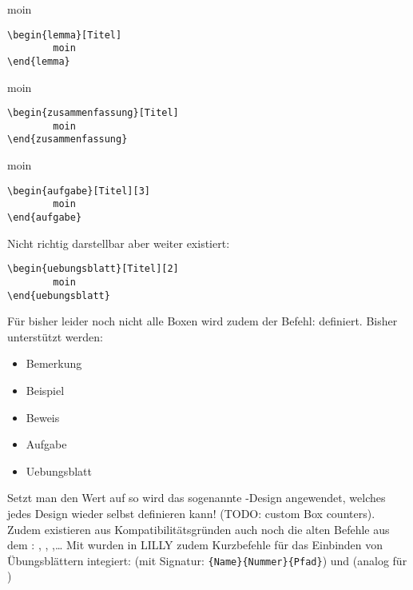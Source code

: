 {\begin{multicols}{2}
\begingroup\begin{lemma}[Titel]
moin
\begin{lstlisting}[style=latex]
\begin{lemma}[Titel]
        moin
\end{lemma}\end{lstlisting}
\end{lemma}\endgroup

\begingroup\begin{zusammenfassung}[Titel]
moin
\begin{lstlisting}[style=latex]
\begin{zusammenfassung}[Titel]
        moin
\end{zusammenfassung}\end{lstlisting}
\end{zusammenfassung}\endgroup

\begingroup\begin{aufgabe}[Titel][3]
moin
\begin{lstlisting}[style=latex]
\begin{aufgabe}[Titel][3]
        moin
\end{aufgabe}\end{lstlisting}
\end{aufgabe}\endgroup

Nicht richtig darstellbar aber weiter existiert:
\begin{lstlisting}[style=latex]
\begin{uebungsblatt}[Titel][2]
        moin
\end{uebungsblatt}\end{lstlisting}

\end{multicols}}
Für bisher leider noch nicht alle Boxen wird zudem der Befehl:  definiert. Bisher unterstützt werden:
\begin{multicols}{3}
    \begin{itemize}[label=$\diamond$]\narrowitems
        \item Bemerkung
        \item Beispiel
        \item Beweis
        \item Aufgabe
        \item Uebungsblatt
    \end{itemize}
\end{multicols}
Setzt man den Wert auf  so wird das sogenannte -Design angewendet, welches jedes Design wieder selbst definieren kann! (TODO: custom Box counters).\newline
Zudem existieren aus Kompatibilitätsgründen auch noch die alten Befehle aus dem : , , ,\ldots\medskip\newline
Mit  wurden in LILLY zudem Kurzbefehle für das Einbinden von Übungsblättern integiert:
 (mit Signatur: \verb|{Name}{Nummer}{Pfad}|) und  (analog für )

